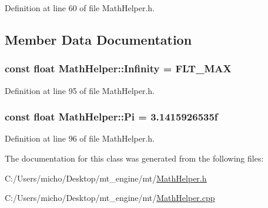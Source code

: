 Definition at line 60 of file Math\+Helper.\+h.



\subsection{Member Data Documentation}
\subsubsection[{\texorpdfstring{Infinity}{Infinity}}]{\setlength{\rightskip}{0pt plus 5cm}const float Math\+Helper\+::\+Infinity = F\+L\+T\+\_\+\+M\+AX\hspace{0.3cm}{\ttfamily [static]}}\hypertarget{class_math_helper_a47ba7794c81623ae250d7593a0e8de6a_a47ba7794c81623ae250d7593a0e8de6a}{}\label{class_math_helper_a47ba7794c81623ae250d7593a0e8de6a_a47ba7794c81623ae250d7593a0e8de6a}


Definition at line 95 of file Math\+Helper.\+h.

\subsubsection[{\texorpdfstring{Pi}{Pi}}]{\setlength{\rightskip}{0pt plus 5cm}const float Math\+Helper\+::\+Pi = 3.\+1415926535f\hspace{0.3cm}{\ttfamily [static]}}\hypertarget{class_math_helper_a988107c0e593a0e1c6aae304814aabf7_a988107c0e593a0e1c6aae304814aabf7}{}\label{class_math_helper_a988107c0e593a0e1c6aae304814aabf7_a988107c0e593a0e1c6aae304814aabf7}


Definition at line 96 of file Math\+Helper.\+h.



The documentation for this class was generated from the following files\+:\begin{DoxyCompactItemize}
\item 
C\+:/\+Users/micho/\+Desktop/mt\+\_\+engine/mt/\hyperlink{_math_helper_8h}{Math\+Helper.\+h}\item 
C\+:/\+Users/micho/\+Desktop/mt\+\_\+engine/mt/\hyperlink{_math_helper_8cpp}{Math\+Helper.\+cpp}\end{DoxyCompactItemize}
